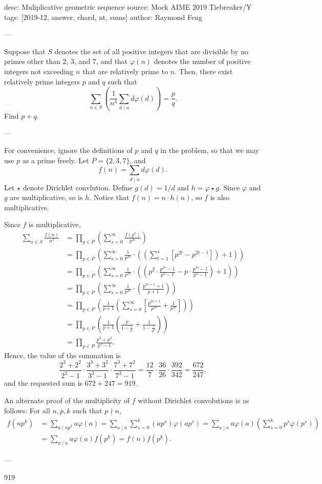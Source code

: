 desc: Muliplicative geometric sequence
source: Mock AIME 2019 Tiebreaker/Y
tags: [2019-12, answer, chard, nt, sums]
author: Raymond Feng

---

Suppose that $S$ denotes the set of all positive integers that are divisible by no primes other than $2$, $3$, and $7$, and that $\varphi(n)$ denotes the number of positive integers not exceeding $n$ that are relatively prime to $n$. Then, there exist relatively prime integers $p$ and $q$ such that \[\sum_{n\in S}\left(\frac1{n^3}\sum_{d\mid n}d\varphi(d)\right)=\frac pq.\]Find $p+q$.

---

For convenience, ignore the definitions of $p$ and $q$ in the problem, so that we may use $p$ as a prime freely. Let $P=\{2,3,7\}$, and \[f(n)=\sum_{d\mid n}d\varphi(d).\]
Let $\star$ denote Dirichlet convlution. Define $g(d)=1/d$ and $h=\varphi\star g$. Since $\varphi$ and $g$ are multiplicative, so is $h$. Notice that $f(n)=n\cdot h(n)$, so $f$ is also multiplicative.

Since $f$ is multiplicative,
\begin{align*}
    \sum_{n\in S} \frac{f(n)}{n^3} &= \prod_{p \in P} \left(\sum_{s=0}^\infty \frac{f(p^s)}{p^{3s}}\right)\\
    &= \prod_{p \in P} \left(\sum_{s=0}^\infty \frac{1}{p^{3s}} \cdot \left(\left(\sum_{t=1}^s \left[p^{2t}-p^{2t-1}\right]\right)+1\right)\right)\\
    &= \prod_{p \in P} \left(\sum_{s=0}^\infty \frac{1}{p^{3s}} \cdot \left(\left(p^2\cdot \frac{p^{2s}-1}{p^2-1}-p\cdot \frac{p^{2s}-1}{p^2-1}\right)+1\right)\right)\\
    &= \prod_{p \in P} \left(\sum_{s=0}^\infty \frac{1}{p^{3s}} \cdot \left(\frac{p^{2s+1}+1}{p+1}\right)\right)\\
    &= \prod_{p \in P} \left(\frac{1}{p+1}\left(\sum_{s=0}^\infty \left[\frac{p^{2s+1}}{p^{3s}}+\frac{1}{p^{3s}}\right]\right)\right)\\
    &= \prod_{p \in P} \left(\frac{1}{p+1}\left(\frac{p}{1-\frac{1}{p}}+\frac{1}{1-\frac{1}{p^3}}\right)\right)\\
    &= \prod_{p \in P} \frac{p^3+p^2}{p^3-1}.
\end{align*}
Hence, the value of the summation is \[\frac{2^3+2^2}{2^3-1}\cdot\frac{3^3+3^2}{3^3-1}\cdot\frac{7^3+7^2}{7^3-1}=\frac{12}7\cdot\frac{36}{26}\cdot\frac{392}{342}=\frac{672}{247},\]
and the requested sum is $672+247=919$.
\begin{remark}
    An alternate proof of the multiplicity of $f$ without Dirichlet convolutions is as follows: For all $n,p,k$ such that $p\nmid n$, \begin{align*}
        f(np^k) &= \sum_{a\mid np^k} a\varphi(a)= \sum_{a\mid n} \sum_{s=0}^k (ap^s)\varphi(ap^s) = \sum_{a\mid n}a\varphi(a)\left(\sum_{s=0}^k p^s\varphi(p^s)\right)\\ &= \sum_{a\mid n}a\varphi(a)f(p^k)= f(n)f(p^k).
    \end{align*}
\end{remark}

---

919
